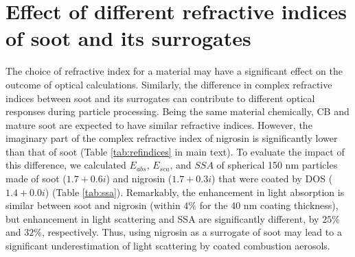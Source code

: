 \documentclass[12pt]{article}
\begin{document}

\section{Effect of different refractive indices of soot and its surrogates}

The choice of refractive index for a material may have a significant effect on the outcome of optical calculations. Similarly, the difference in complex refractive indices between soot and its surrogates can contribute to different optical responses during particle processing. Being the same material chemically, CB and mature soot are expected to have similar refractive indices. However, the imaginary part of the complex refractive index of nigrosin is significantly lower than that of soot (Table \ref{tab:refindices} in main text). To evaluate the impact of this difference, we calculated $E_{abs}$, $E_{sca}$, and $SSA$ of spherical 150 nm particles made of soot ($1.7+0.6i$) and nigrosin ($1.7+0.3i$) that were coated by DOS ($1.4+0.0i$) (Table \ref{tab:ssa}). Remarkably, the enhancement in light absorption is similar between soot and nigrosin (within $4\%$ for the 40 nm coating thickness), but enhancement in light scattering and SSA are significantly different, by $25\%$ and $32\%$, respectively. Thus, using nigrosin as a surrogate of soot may lead to a significant underestimation of light scattering by coated combustion aerosols.  



\end{document}
